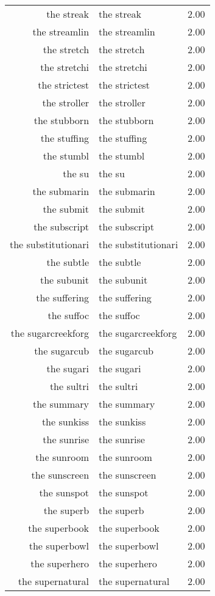 \begin{table}[ht]
\begin{tabular}{rlr}
  the streak & the streak & 2.00 \\ 
  the streamlin & the streamlin & 2.00 \\ 
  the stretch & the stretch & 2.00 \\ 
  the stretchi & the stretchi & 2.00 \\ 
  the strictest & the strictest & 2.00 \\ 
  the stroller & the stroller & 2.00 \\ 
  the stubborn & the stubborn & 2.00 \\ 
  the stuffing & the stuffing & 2.00 \\ 
  the stumbl & the stumbl & 2.00 \\ 
  the su & the su & 2.00 \\ 
  the submarin & the submarin & 2.00 \\ 
  the submit & the submit & 2.00 \\ 
  the subscript & the subscript & 2.00 \\ 
  the substitutionari & the substitutionari & 2.00 \\ 
  the subtle & the subtle & 2.00 \\ 
  the subunit & the subunit & 2.00 \\ 
  the suffering & the suffering & 2.00 \\ 
  the suffoc & the suffoc & 2.00 \\ 
  the sugarcreekforg & the sugarcreekforg & 2.00 \\ 
  the sugarcub & the sugarcub & 2.00 \\ 
  the sugari & the sugari & 2.00 \\ 
  the sultri & the sultri & 2.00 \\ 
  the summary & the summary & 2.00 \\ 
  the sunkiss & the sunkiss & 2.00 \\ 
  the sunrise & the sunrise & 2.00 \\ 
  the sunroom & the sunroom & 2.00 \\ 
  the sunscreen & the sunscreen & 2.00 \\ 
  the sunspot & the sunspot & 2.00 \\ 
  the superb & the superb & 2.00 \\ 
  the superbook & the superbook & 2.00 \\ 
  the superbowl & the superbowl & 2.00 \\ 
  the superhero & the superhero & 2.00 \\ 
  the supernatural & the supernatural & 2.00 \\ 

\end{tabular}
\end{table}
